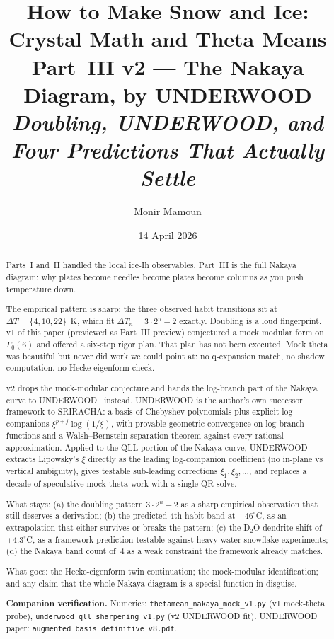 \documentclass[11pt,letterpaper]{article}
\title{\textbf{How to Make Snow and Ice: \\ Crystal Math and Theta Means} \\[0.3em]
  \normalsize Part~III v2 --- The Nakaya Diagram, by UNDERWOOD \\
  \normalsize \emph{Doubling, UNDERWOOD, and Four Predictions That Actually Settle}}
\author{Monir Mamoun}
\date{14 April 2026}
\theoremstyle{plain}
\theoremstyle{definition}
\begin{document}
\maketitle

\begin{abstract}
Parts~I and~II handled the local ice-Ih observables.  Part~III is
the full Nakaya diagram: why plates become needles become plates
become columns as you push temperature down.

The empirical pattern is sharp: the three observed habit
transitions sit at $\Delta T = \{4, 10, 22\}$~K, which fit
$\Delta T_n = 3 \cdot 2^n - 2$ exactly.  Doubling is a loud
fingerprint.  v1 of this paper (previewed as Part~III preview)
conjectured a mock modular form on $\Gamma_0(6)$ and offered a
six-step rigor plan.  That plan has not been executed.  Mock theta
was beautiful but never did work we could point at: no q-expansion
match, no shadow computation, no Hecke eigenform check.

v2 drops the mock-modular conjecture and hands the log-branch part
of the Nakaya curve to UNDERWOOD~\cite{Underwood2026} instead.
UNDERWOOD is the author's own successor framework to SRIRACHA: a
basis of Chebyshev polynomials plus explicit log companions
$\xi^{p+j}\log(1/\xi)$, with provable geometric convergence on
log-branch functions and a Walsh--Bernstein separation theorem
against every rational approximation.  Applied to the QLL portion
of the Nakaya curve, UNDERWOOD extracts Lipowsky's $\xi$ directly
as the leading log-companion coefficient (no in-plane vs vertical
ambiguity), gives testable sub-leading corrections
$\xi_1, \xi_2, \ldots$, and replaces a decade of speculative
mock-theta work with a single QR solve.

What stays: (a) the doubling pattern $3 \cdot 2^n - 2$ as a sharp
empirical observation that still deserves a derivation; (b) the
predicted 4th habit band at $-46^\circ$C, as an extrapolation that
either survives or breaks the pattern; (c) the D$_2$O dendrite
shift of $+4.3^\circ$C, as a framework prediction testable against
heavy-water snowflake experiments; (d) the Nakaya band count of~$4$
as a weak constraint the framework already matches.

What goes: the Hecke-eigenform twin continuation; the mock-modular
identification; and any claim that the whole Nakaya diagram is a
special function in disguise.

\noindent\textbf{Companion verification.} Numerics:
\texttt{thetamean\_nakaya\_mock\_v1.py} (v1 mock-theta probe),
\texttt{underwood\_qll\_sharpening\_v1.py} (v2 UNDERWOOD fit).
UNDERWOOD paper: \texttt{augmented\_basis\_definitive\_v8.pdf}.
\end{abstract}
\end{document}
